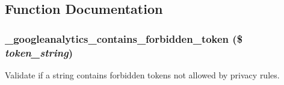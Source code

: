 \subsection{Function Documentation}
\hypertarget{googleanalytics_8admin_8inc_a5b9e604bc6be58cb66a3c479aadc1481}{
\subsubsection[{\_\-googleanalytics\_\-contains\_\-forbidden\_\-token}]{\setlength{\rightskip}{0pt plus 5cm}\_\-googleanalytics\_\-contains\_\-forbidden\_\-token (\$ {\em token\_\-string})}}
\label{googleanalytics_8admin_8inc_a5b9e604bc6be58cb66a3c479aadc1481}
Validate if a string contains forbidden tokens not allowed by privacy rules.


